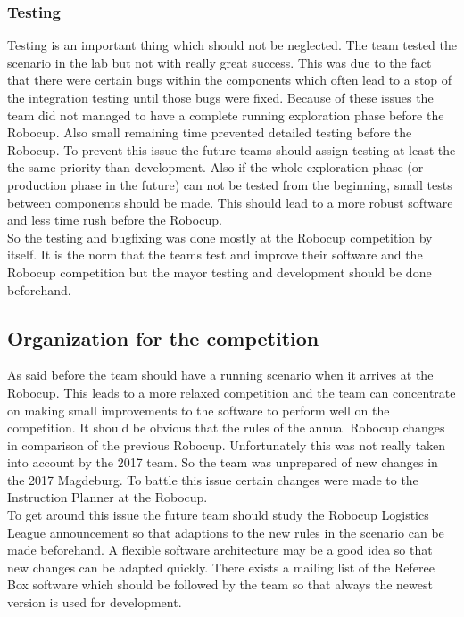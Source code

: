 \subsubsection{Testing}

Testing is an important thing which should not be neglected. The team tested the scenario in the lab but not with really great success. This was due to the fact that there were certain bugs within the components which often lead to a stop of the integration testing until those bugs were fixed. Because of these issues the team did not managed to have a complete running exploration phase before the Robocup. Also small remaining time prevented detailed testing before the Robocup. To prevent this issue the future teams should assign testing at least the the same priority than development. Also if the whole exploration phase (or production phase in the future) can not be tested from the beginning, small tests between components should be made. This should lead to a more robust software and less time rush before the Robocup. \\

So the testing and bugfixing was done mostly at the Robocup competition by itself. It is the norm that the teams test and improve their software and the Robocup competition but the mayor testing and development should be done beforehand. 

 
\subsection{Organization for the competition}
 
As said before the team should have a running scenario when it arrives at the Robocup. This leads to a more relaxed competition and the team can concentrate on making small improvements to the software to perform well on the competition. It should be obvious that the rules of the annual Robocup changes in comparison of the previous Robocup. Unfortunately this was not really taken into account by the 2017 team. So the team was unprepared of new changes in the 2017 Magdeburg. To battle this issue certain changes were made to the Instruction Planner at the Robocup.  \\

To get around this issue the future team should study the Robocup Logistics League announcement so that adaptions to the new rules in the scenario can be made beforehand. A flexible software architecture may be a good idea so that new changes can be adapted quickly. There exists a mailing list of the Referee Box software which should be followed by the team so that always the newest version is used for development. \\

